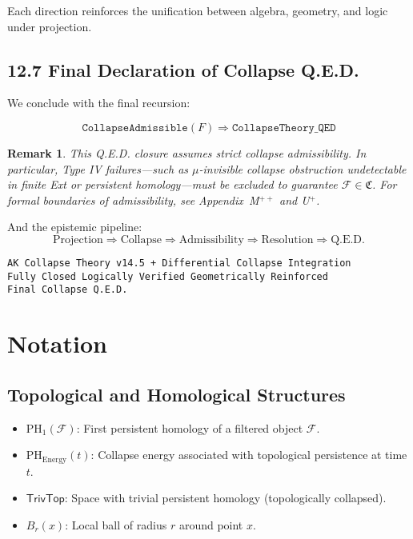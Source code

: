 \documentclass[11pt]{article}
\newtheorem{remark}[theorem]{Remark}
\begin{document}
Each direction reinforces the unification between algebra, geometry, and logic under projection.

\subsection*{12.7 Final Declaration of Collapse Q.E.D.}

We conclude with the final recursion:

\[
\boxed{
\texttt{CollapseAdmissible}(F) \Rightarrow \texttt{CollapseTheory\_QED}
}
\]

\begin{remark}
This Q.E.D. closure assumes strict collapse admissibility.
In particular, Type IV failures—such as $\mu$-invisible collapse obstruction undetectable in finite Ext or persistent homology—must be excluded to guarantee $\mathcal{F} \in \mathfrak{C}$.
For formal boundaries of admissibility, see Appendix~M$^{++}$ and U$^+$.
\end{remark}



And the epistemic pipeline:
\[
\boxed{
\text{Projection} \Rightarrow \text{Collapse} \Rightarrow \text{Admissibility} \Rightarrow \text{Resolution} \Rightarrow \text{Q.E.D.}
}
\]

\begin{flushright}
\texttt{AK Collapse Theory v14.5 + Differential Collapse Integration}\\
\texttt{Fully Closed \quad Logically Verified \quad Geometrically Reinforced}\\
\texttt{Final Collapse Q.E.D.}
\end{flushright}





\section*{Notation}

\subsection*{Topological and Homological Structures}

\begin{itemize}
  \item $\mathrm{PH}_1(\mathcal{F})$: First persistent homology of a filtered object $\mathcal{F}$.
  \item $\mathrm{PH}_{\mathrm{Energy}}(t)$: Collapse energy associated with topological persistence at time $t$.
  \item $\mathsf{TrivTop}$: Space with trivial persistent homology (topologically collapsed).
  \item $B_r(x)$: Local ball of radius $r$ around point $x$.
\end{itemize}
\end{document}
